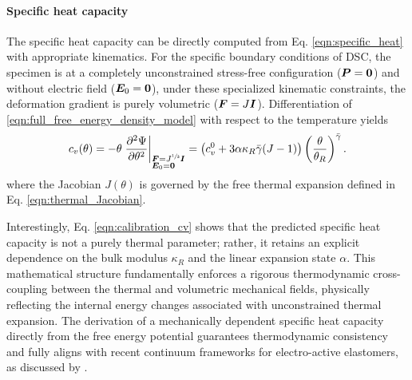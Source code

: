 \paragraph{Specific heat capacity}
The specific heat capacity can be directly computed from Eq. \eqref{eqn:specific_heat} with appropriate kinematics. For the specific boundary conditions of DSC, the specimen is at a completely unconstrained stress-free configuration ($\boldsymbol{P}=\mathbf{0}$) and without electric field ($\boldsymbol{E}_0=\mathbf{0}$), under these specialized kinematic constraints, the deformation gradient is purely volumetric ($\boldsymbol{F} = J\boldsymbol{I}$). Differentiation of \eqref{eqn:full_free_energy_density_model} with respect to the temperature yields
\begin{equation}
  \label{eqn:calibration_cv}
  c_v(\theta) =
    -\theta \left. \frac{\partial^2\Psi}{\partial \theta^2} \right|_{\substack{\F=J^{\sfrac{1}{3}}\I\\ \E_0=\mathbf{0}\hfill}} =
    \left(c_v^0 + 3\alpha\kappa_R\bar\gamma(J-1)\right)
    \left(\frac{\theta}{\theta_R}\right)^{\bar\gamma} .
\end{equation}
where the Jacobian $J(\theta)$ is governed by the free thermal expansion defined in Eq. \eqref{eqn:thermal_Jacobian}. 

Interestingly, Eq. \eqref{eqn:calibration_cv} shows that the predicted specific heat capacity is not a purely thermal parameter; rather, it retains an explicit dependence on the bulk modulus $\kappa_R$ and the linear expansion state $\alpha$. This mathematical structure fundamentally enforces a rigorous thermodynamic cross-coupling between the thermal and volumetric mechanical fields, physically reflecting the internal energy changes associated with unconstrained thermal expansion. The derivation of a mechanically dependent specific heat capacity directly from the free energy potential guarantees thermodynamic consistency and fully aligns with recent continuum frameworks for electro-active elastomers, as discussed by \cite{BonetGil2026}.


